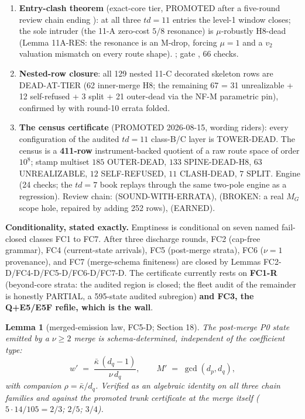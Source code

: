 \documentclass[11pt]{article}
\newtheorem{lemma}[theorem]{Lemma}
\theoremstyle{definition}
\theoremstyle{remark}
\begin{document}
\begin{enumerate}
\item \textbf{Entry-clash theorem} (exact-core tier, PROMOTED after a
five-round review chain ending ): at all three
$td=11$ entries the level-1 window closes; the sole intruder (the 11-A
zero-cost $5/8$ resonance) is $\mu$-robustly H8-dead (Lemma 11A-RES: the
resonance is an M-drop, forcing $\mu=1$ and a $v_2$ valuation mismatch on
every route shape). ; gate , 66
checks.
\item \textbf{Nested-row closure}: all 129 nested 11-C decorated skeleton
rows are DEAD-AT-TIER (62 inner-merge H8; the remaining 67 = 31
unrealizable + 12 self-refused + 3 split + 21 outer-dead via the NF-M
parametric pin), confirmed by  with round-10
errata folded.
\item \textbf{The census certificate} (PROMOTED 2026-08-15, wording riders):
every configuration of the audited $td=11$ class-B/C layer is TOWER-DEAD.
The census is a \textbf{411-row} instrument-backed quotient of a raw route
space of order $10^8$; stamp multiset $185$ OUTER-DEAD, $133$ SPINE-DEAD-H8,
$63$ UNREALIZABLE, $12$ SELF-REFUSED, $11$ CLASH-DEAD, $7$ SPLIT. Engine
 (24 checks; the $td=7$ book replays through the
same two-pole engine as a regression). Review chain:
 (SOUND-WITH-ERRATA),
 (BROKEN: a real $M_G$ scope hole, repaired
by adding 252 rows),  (EARNED).
\end{enumerate}

\textbf{Conditionality, stated exactly.} Emptiness is conditional on seven
named fail-closed classes FC1 to FC7. After three discharge rounds, FC2
(cap-free grammar), FC4 (current-state arrivals), FC5 (post-merge strata),
FC6 ($\nu=1$ provenance), and FC7 (merge-schema finiteness) are closed by
Lemmas FC2-D/FC4-D/FC5-D/FC6-D/FC7-D. The certificate currently rests on
\textbf{FC1-R} (beyond-core strata: the audited region is closed; the
fleet audit of the remainder is honestly PARTIAL, a 595-state audited
subregion) \textbf{and FC3, the Q+E5/E5F refile, which is the wall}.

\begin{lemma}[merged-emission law, FC5-D;  Section 18]\label{lem:emission}
The post-merge P0 state emitted by a $\nu\ge 2$ merge is schema-determined,
independent of the coefficient type:
\[
w' \;=\; \frac{\bar\kappa\,(d_q-1)}{\nu\, d_q},
\qquad M' \;=\; \gcd(d_p,d_q),
\]
with companion $\rho=\bar\kappa/d_q$. Verified as an algebraic identity on
all three chain families and against the promoted trunk certificate at the
merge itself ($5\cdot 14/105=2/3$; $2/5$; $3/4$).
\end{lemma}
\end{document}
